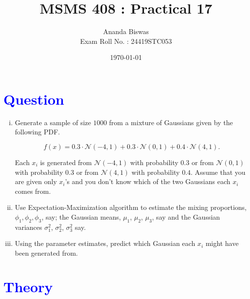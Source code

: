 \documentclass[11pt, a4paper]{article}\usepackage[]{graphicx}\usepackage[]{xcolor}
\title{MSMS 408 : Practical 17}
\author{{\fontsize{25}{20} \benyorithafont Ananda Biswas} \\[1em] Exam Roll No. : 24419STC053}
\date{\today}
\begin{document}
\maketitle


\section*{\faArrowAltCircleRight[regular] \textcolor{blue}{Question}}

\begin{enumerate}[(i)]
\item Generate a sample of size $1000$ from a mixture of Gaussians given by the following PDF.

$$f(x) = 0.3 \cdot \mathcal{N}(-4, 1) + 0.3 \cdot \mathcal{N}(0, 1) + 0.4 \cdot \mathcal{N}(4, 1).$$

Each $x_i$ is generated from $\mathcal{N}(-4, 1)$ with probability $0.3$ or from $\mathcal{N}(0, 1)$ with probability $0.3$ or from $\mathcal{N}(4, 1)$ with probability $0.4$. Assume that you are given only $x_i$'s and you don't know which of the two Gaussians each $x_i$ comes from.

\item Use Expectation-Maximization algorithm to estimate the mixing proportions, $\phi_1, \phi_2, \phi_3$, say; the Gaussian means, $\mu_1$, $\mu_2$, $\mu_3$, say and the Gaussian variances $\sigma_1^2$, $\sigma_2^2$, $\sigma_3^2$ say.

\item Using the parameter estimates, predict which Gaussian each $x_i$ might have been generated from.
\end{enumerate}


\section*{\faArrowAltCircleRight[regular] \textcolor{blue}{Theory}}

\vspace{1cm}
\end{document}
